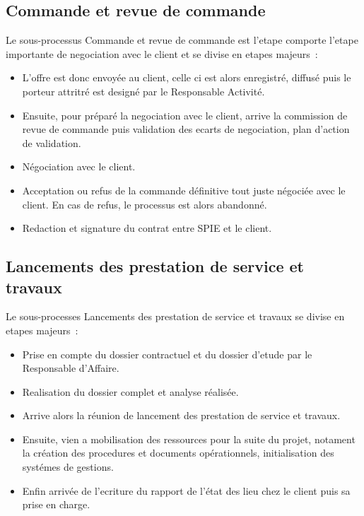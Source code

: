 \subsection{Commande et revue de commande}

Le sous-processus Commande et revue de commande est l'etape comporte l'etape importante de negociation
avec le client et se divise en etapes majeurs~:

\begin{itemize}
    \item L'offre est donc envoy\'ee au client, celle ci est alors enregistr\'e, diffus\'e puis le
    porteur attritr\'e est design\'e par le Responsable Activit\'e.
    \item Ensuite, pour pr\'epar\'e la negociation avec le client, arrive la commission de revue de
    commande puis validation des ecarts de negociation, plan d'action de validation.
    \item N\'egociation avec le client.
    \item Acceptation ou refus de la commande d\'efinitive tout juste n\'egoci\'ee avec le client.
    En cas de refus, le processus est alors abandonn\'e.
    \item Redaction et signature du contrat entre SPIE et le client.
\end{itemize}

\subsection{Lancements des prestation de service et travaux}

Le sous-processes Lancements des prestation de service et travaux se divise en etapes majeurs~:

\begin{itemize}
    \item Prise en compte du dossier contractuel et du dossier d'etude par le Responsable d'Affaire.
    \item Realisation du dossier complet et analyse r\'ealis\'ee.
    \item Arrive alors la r\'eunion  de lancement des prestation de service et travaux.
    \item Ensuite, vien a mobilisation des ressources pour la suite du projet, notament la cr\'eation
    des procedures et documents op\'erationnels, initialisation des syst\'emes de gestions.
    \item Enfin arriv\'ee de l'ecriture du rapport de l'\'etat des lieu chez le client puis sa prise en charge.
\end{itemize}

